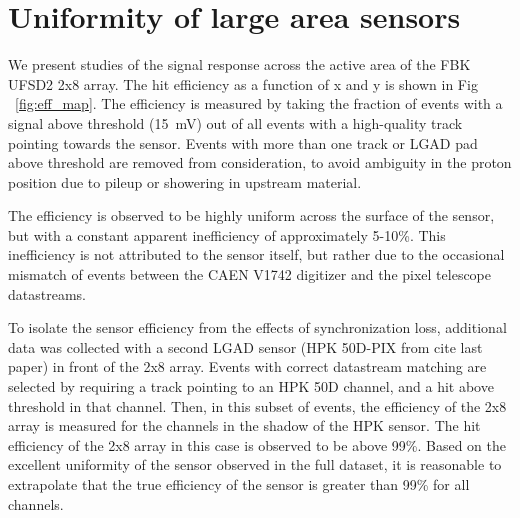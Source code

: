 \documentclass[preprint,1p]{elsarticle}
\begin{document}
\section{Uniformity of large area sensors}
\label{sec:largeAreaStudies}


We present studies of the signal response across the active area of the FBK UFSD2 2x8 array. The hit efficiency as a function of x and y is shown in Fig ~\ref{fig:eff_map}. The efficiency is measured by taking the fraction of events with a signal above threshold (\SI{15}{\milli \volt}) out of all events with a high-quality track pointing towards the sensor. Events with more than one track or LGAD pad above threshold are removed from consideration, to avoid ambiguity in the proton position due to pileup or showering in upstream material.

The efficiency is observed to be highly uniform across the surface of the sensor, but with a constant apparent inefficiency of approximately 5-10\%. This inefficiency is not attributed to the sensor itself, but rather due to the occasional mismatch of events between the CAEN V1742 digitizer and the pixel telescope datastreams.

To isolate the sensor efficiency from the effects of synchronization loss, additional data was collected with a second LGAD sensor (HPK 50D-PIX from cite last paper) in front of the 2x8 array. Events with correct datastream matching are selected by requiring a track pointing to an HPK 50D channel, and a hit above threshold in that channel. Then, in this subset of events, the efficiency of the 2x8 array is measured for the channels in the shadow of the HPK sensor. The hit efficiency of the 2x8 array in this case is observed to be above 99\%. Based on the excellent uniformity of the sensor observed in the full dataset, it is reasonable to extrapolate that the true efficiency of the sensor is greater than 99\% for all channels.
\end{document}

